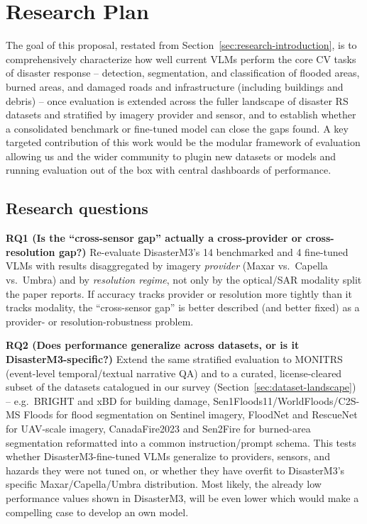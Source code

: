 \section{Research Plan}
\label{sec:research-plan}

The goal of this proposal, restated from Section~\ref{sec:research-introduction},
is to comprehensively characterize how well current VLMs perform the core CV
tasks of disaster response -- detection, segmentation, and classification of
flooded areas, burned areas, and damaged roads and infrastructure (including
buildings and debris) -- once evaluation is extended across the fuller
landscape of disaster RS datasets and stratified by imagery provider and
sensor, and to establish whether a consolidated benchmark or fine-tuned model
can close the gaps found. A key targeted contribution of this work would be the modular framework of evaluation allowing us
and the wider community to plugin new datasets or models and running evaluation out of the box with central dashboards of performance.

\subsection{Research questions}

\textbf{RQ1 (Is the ``cross-sensor gap'' actually a cross-provider or
cross-resolution gap?)} Re-evaluate DisasterM3's 14 benchmarked and 4
fine-tuned VLMs with results disaggregated by imagery \emph{provider} (Maxar
vs.\ Capella vs.\ Umbra) and by \emph{resolution regime}, not only by the
optical/SAR modality split the paper reports. If accuracy tracks provider or
resolution more tightly than it tracks modality, the ``cross-sensor gap'' is
better described (and better fixed) as a provider- or resolution-robustness
problem.

\textbf{RQ2 (Does performance generalize across datasets, or is it
DisasterM3-specific?)} Extend the same stratified evaluation to MONITRS
(event-level temporal/textual narrative QA) and to a curated, license-cleared
subset of the datasets catalogued in our survey
(Section~\ref{sec:dataset-landscape}) -- e.g.\ BRIGHT and xBD for building
damage, Sen1Floods11/WorldFloods/C2S-MS Floods for flood segmentation on
Sentinel imagery, FloodNet and RescueNet for UAV-scale imagery, CanadaFire2023
and Sen2Fire for burned-area segmentation reformatted into a common
instruction/prompt schema. This tests whether DisasterM3-fine-tuned VLMs
generalize to providers, sensors, and hazards they were not tuned on, or
whether they have overfit to DisasterM3's specific Maxar/Capella/Umbra
distribution. Most likely, the already low performance values shown in DisasterM3, will be even lower which would make a compelling case
to develop an own model.

